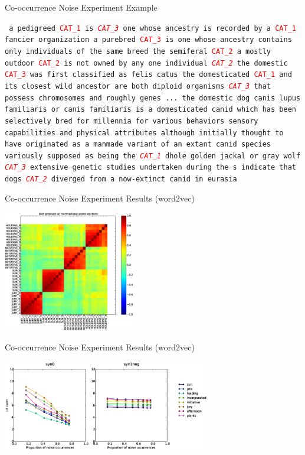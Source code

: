 \documentclass{beamer}
\begin{document}
\begin{frame}{Co-occurrence Noise Experiment Example}
	\par
	{\small
		\texttt{ a pedigreed \textcolor{red}{CAT\_1} is \textcolor{red}{\textit{CAT\_3}} one whose ancestry is recorded by a \textcolor{red}{CAT\_1} fancier organization
a purebred \textcolor{red}{CAT\_3} is one whose ancestry contains only individuals of the same breed
the semiferal \textcolor{red}{CAT\_2} a mostly outdoor \textcolor{red}{CAT\_2} is not owned by any one individual
\textcolor{red}{\textit{CAT\_2}} the domestic \textcolor{red}{CAT\_3} was first classified as felis catus
the domesticated \textcolor{red}{CAT\_1} and its closest wild ancestor are both diploid organisms \textcolor{red}{\textit{CAT\_3}} that possess  chromosomes and roughly  genes
...
the domestic dog canis lupus familiaris or canis familiaris is a domesticated canid which has been selectively bred for millennia for various behaviors sensory capabilities and physical attributes
although initially thought to have originated as a manmade variant of an extant canid species variously supposed as being the \textcolor{red}{\textit{CAT\_1}} dhole golden jackal or gray wolf \textcolor{red}{\textit{CAT\_3}} extensive genetic studies undertaken during the s indicate that dogs \textcolor{red}{\textit{CAT\_2}} diverged from a now-extinct canid in eurasia
} \par}
\end{frame}

\begin{frame}{Co-occurrence Noise Experiment Results (word2vec)}
	\begin{center}
	\includegraphics[height=200px]{cooccurrence-noise-heatmap} \\
	\end{center}
\end{frame}


\begin{frame}{Co-occurrence Noise Experiment Results (word2vec)}
	\begin{center}
	\includegraphics[height=150px]{cooccurrence-noise-graph} \\
	\end{center}
\end{frame}
\end{document}
